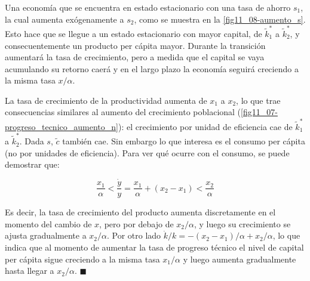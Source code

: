 \documentclass[DeGregorioResumen]{subfiles}
\begin{document}

Una economía que se encuentra en estado estacionario con una tasa de ahorro $s_1$, la cual aumenta exógenamente a $s_2$, como se muestra en la \autoref{fig11_08-aumento_s}. Esto hace que se llegue a un estado estacionario con mayor  capital, de $\tilde k^*_1$ a $\tilde k^*_2$, y consecuentemente un producto per cápita mayor. Durante la transición aumentará la tasa de crecimiento, pero a medida que el capital se vaya acumulando su retorno caerá y en el largo plazo la economía seguirá creciendo a la misma tasa $x/\alpha$.




La tasa de crecimiento de la productividad aumenta de $x_1$ a $x_2$, lo que trae consecuencias similares al aumento del crecimiento poblacional (\autoref{fig11_07-progreso_tecnico_aumento_n}): el crecimiento por unidad de eficiencia cae de $\tilde k^*_1$ a $\tilde k^*_2$. Dada $s$, $\tilde c$ también cae. Sin embargo lo que interesa es el consumo per cápita (no por unidades de eficiencia). Para ver qué ocurre con el consumo, se puede demostrar que:

\[
\frac{x_1}{\alpha} < \frac{\dot y}{y	} = \frac{x_1}{\alpha} + (x_2-x_1) < \frac{x_2}{\alpha}
\]

Es decir, la tasa de crecimiento del producto aumenta discretamente en el momento del cambio de $x$, pero por debajo de $x_2/\alpha$, y luego su crecimiento se ajusta gradualmente a $x_2/\alpha$. Por otro lado $\dot k/k = -(x_2-x_1)/\alpha + x_2/\alpha $, lo que indica que al momento de aumentar la tasa de progreso técnico el nivel de capital per cápita sigue creciendo a la misma tasa $x_1/\alpha$ y luego aumenta gradualmente hasta llegar a $x_2/\alpha$. $\blacksquare$
\end{document}
